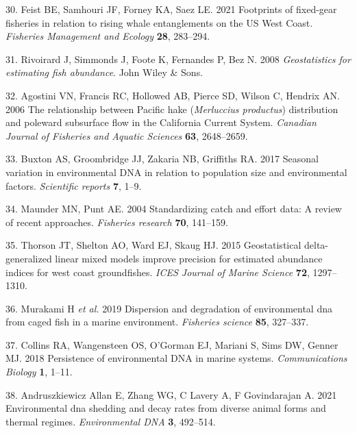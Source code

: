 \documentclass[
]{article}
\begin{document}
\leavevmode\hypertarget{ref-feist2021footprints}{}%
30. Feist BE, Samhouri JF, Forney KA, Saez LE. 2021 Footprints of
fixed-gear fisheries in relation to rising whale entanglements on the US
West Coast. \emph{Fisheries Management and Ecology} \textbf{28},
283--294.

\leavevmode\hypertarget{ref-rivoirard2008geostatistics}{}%
31. Rivoirard J, Simmonds J, Foote K, Fernandes P, Bez N. 2008
\emph{Geostatistics for estimating fish abundance}. John Wiley \& Sons.

\leavevmode\hypertarget{ref-agostini2006relationship}{}%
32. Agostini VN, Francis RC, Hollowed AB, Pierce SD, Wilson C, Hendrix
AN. 2006 The relationship between Pacific hake (\textit{Merluccius productus})
distribution and poleward subsurface flow in the California Current
System. \emph{Canadian Journal of Fisheries and Aquatic Sciences}
\textbf{63}, 2648--2659.

\leavevmode\hypertarget{ref-buxton2017seasonal}{}%
33. Buxton AS, Groombridge JJ, Zakaria NB, Griffiths RA. 2017 Seasonal
variation in environmental DNA in relation to population size and
environmental factors. \emph{Scientific reports} \textbf{7}, 1--9.

\leavevmode\hypertarget{ref-maunder2004standardizing}{}%
34. Maunder MN, Punt AE. 2004 Standardizing catch and effort data: A
review of recent approaches. \emph{Fisheries research} \textbf{70},
141--159.

\leavevmode\hypertarget{ref-thorson2015geostatistical}{}%
35. Thorson JT, Shelton AO, Ward EJ, Skaug HJ. 2015 Geostatistical
delta-generalized linear mixed models improve precision for estimated
abundance indices for west coast groundfishes. \emph{ICES Journal of
Marine Science} \textbf{72}, 1297--1310.

\leavevmode\hypertarget{ref-murakami2019dispersion}{}%
36. Murakami H \emph{et al.} 2019 Dispersion and degradation of
environmental dna from caged fish in a marine environment.
\emph{Fisheries science} \textbf{85}, 327--337.

\leavevmode\hypertarget{ref-collins2018persistence}{}%
37. Collins RA, Wangensteen OS, O'Gorman EJ, Mariani S, Sims DW, Genner
MJ. 2018 Persistence of environmental DNA in marine systems.
\emph{Communications Biology} \textbf{1}, 1--11.

\leavevmode\hypertarget{ref-andruszkiewicz2021environmental}{}%
38. Andruszkiewicz Allan E, Zhang WG, C Lavery A, F Govindarajan A. 2021
Environmental dna shedding and decay rates from diverse animal forms and
thermal regimes. \emph{Environmental DNA} \textbf{3}, 492--514.
\end{document}
